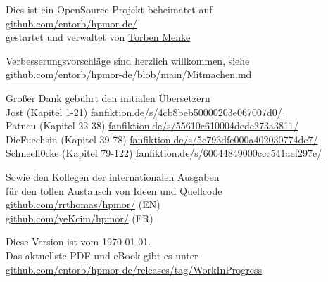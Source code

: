 \newpage
\begin{center}
\noindent
\vfill
Dies ist ein OpenSource Projekt beheimatet auf \\
{\small\href{https://github.com/entorb/hpmor-de/}{github.com/entorb/hpmor-de/}}\\
gestartet und verwaltet von \href{https://entorb.net}{Torben Menke}

\vspace*{1\baselineskip}
Verbesserungsvorschläge sind herzlich willkommen, siehe\\
{\small\href{https://github.com/entorb/hpmor-de/blob/main/Mitmachen.md}{github.com/entorb/hpmor-de/blob/main/Mitmachen.md}}

\vspace*{1\baselineskip}
Großer Dank gebührt den initialen Übersetzern\\
Jost (Kapitel 1-21) {\small\href{https://www.fanfiktion.de/s/4cb8beb50000203e067007d0/}{fanfiktion.de/s/4cb8beb50000203e067007d0/}}\\
Patneu (Kapitel 22-38) {\small\href{https://www.fanfiktion.de/s/55610c610004dede273a3811/}{fanfiktion.de/s/55610c610004dede273a3811/}}\\
DieFuechsin (Kapitel 39-78) {\small\href{https://www.fanfiktion.de/s/5c793dfe000a402030774dc7/}{fanfiktion.de/s/5c793dfe000a402030774dc7/}}\\
Schneefl0cke (Kapitel 79-122) {\small\href{https://www.fanfiktion.de/s/60044849000ccc541aef297e/}{fanfiktion.de/s/60044849000ccc541aef297e/}}

\vspace*{1\baselineskip}
Sowie den Kollegen der internationalen Ausgaben\\
für den tollen Austausch von Ideen und Quellcode\\
{\small\href{https://github.com/rrthomas/hpmor/}{github.com/rrthomas/hpmor/}} (EN)\\
{\small\href{https://github.com/yeKcim/hpmor/}{github.com/yeKcim/hpmor/}} (FR)

\vspace*{1\baselineskip}
Diese Version ist vom \today{}.\\
Das aktuellste PDF und eBook gibt es unter\\
{\small\href{https://github.com/entorb/hpmor-de/releases/tag/WorkInProgress}{github.com/entorb/hpmor-de/releases/tag/WorkInProgress}}\\
\end{center}
